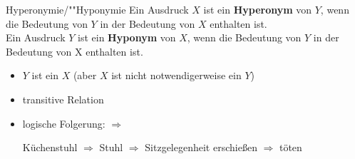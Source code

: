 
\begin{frame}

\begin{block}{Hyperonymie/""Hyponymie}
Ein Ausdruck $X$ ist ein \textbf{Hyperonym} von $Y$, wenn die Bedeutung von $Y$ in der Bedeutung von $X$ enthalten ist. \\ Ein Ausdruck $Y$ ist ein \textbf{Hyponym} von $X$, wenn die Bedeutung von $Y$ in der Bedeutung von X enthalten ist.
\end{block}

\begin{itemize}
	\item $Y$ ist ein $X$ (aber $X$ ist nicht notwendigerweise ein $Y$)		
	\item transitive Relation
	\item logische Folgerung: $\Rightarrow$
	
	\eal 
		\ex Küchenstuhl $\Rightarrow$ Stuhl $\Rightarrow$ Sitzgelegenheit
		\ex erschie\ss{}en $\Rightarrow$ töten
	\zl
		
\end{itemize}

\end{frame}


